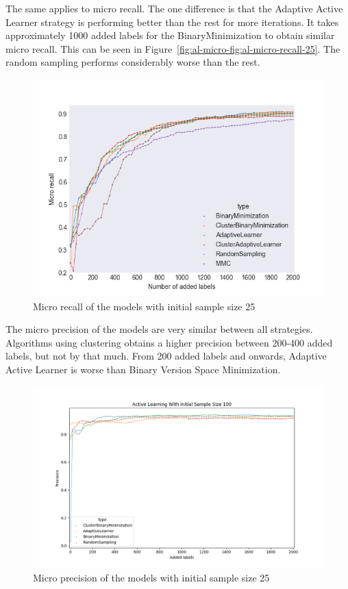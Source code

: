 The same applies to micro recall.
The one difference is that the Adaptive Active Learner strategy is performing better than the rest for more iterations.
It takes approximately 1000 added labels for the BinaryMinimization to obtain similar micro recall.
This can be seen in Figure~\ref{fig:al-micro-fig:al-micro-recall-25}.
The random sampling performs considerably worse than the rest.

\begin{figure}
    \centering
    \includegraphics[scale=0.5]{figures/al-25-micro-recall.png}
    \caption{Micro recall of the models with initial sample size 25}
    \label{fig:al-micro-recall-25}
\end{figure}

The micro precision of the models are very similar between all strategies.
Algorithms using clustering obtains a higher precision between 200-400 added labels, but not by that much.
From 200 added labels and onwards, Adaptive Active Learner is worse than Binary Version Space Minimization.

\begin{figure}
    \centering
    \includegraphics[scale=0.5]{figures/al-100-micro-precision.png}
    \caption{Micro precision of the models with initial sample size 25}
    \label{fig:al-micro-precision-25}
\end{figure}

